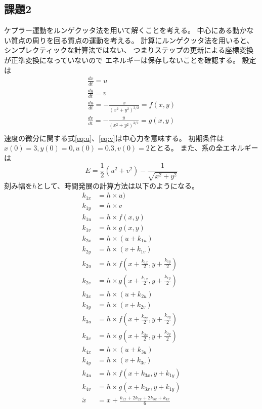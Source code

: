 \documentclass{jsarticle}
\begin{document}
\subsection{課題2}
ケプラー運動をルンゲクッタ法を用いて解くことを考える。
中心にある動かない質点の周りを回る質点の運動を考える。
計算にルンゲクッタ法を用いると、シンプレクティックな計算法ではない、
つまりステップの更新による座標変換が正準変換になっていないので
エネルギーは保存しないことを確認する。
設定は
\begin{align}
    \frac{dx}{dt} = u\\
    \frac{dy}{dt} = v\\
    \frac{du}{dt} = - \frac{x}{(x^2 + y^2)^{3/2}} = f(x, y)\label{eq:u}\\
    \frac{dv}{dt} = - \frac{y}{(x^2 + y^2)^{3/2}}=g(x,y)\label{eq:v}\\
\end{align}
速度の微分に関する式\eqref{eq:u}、\eqref{eq:v}は中心力を意味する。
初期条件は$x(0) = 3,y(0)=0,u(0)=0.3,v(0)=2$ととる。
また、系の全エネルギーは
\begin{equation}
    E = \frac{1}{2} (u^2 + v^2) - \frac{1}{\sqrt{x^2 + y^2}}
\end{equation}
刻み幅を$h$として、時間発展の計算方法は以下のようになる。
\begin{align}
    k_{1x} &= h  \times u)\\
    k_{1y} &= h  \times v\\
    k_{1u} &= h  \times f(x, y)\\
    k_{1v} &= h  \times g(x, y)\\
    k_{2x} &= h  \times (u + k_{1u})\\
    k_{2y} &= h  \times (v + k_{1v})\\
    k_{2u} &= h  \times f(x + \frac{k_{1x}}{2}, y+ \frac{k_{1y}}{2})\\
    k_{2v} &= h  \times g(x + \frac{k_{1x}}{2}, y+ \frac{k_{1y}}{2})\\
    k_{3x} &= h  \times (u + k_{2u})\\
    k_{3y} &= h  \times (v + k_{2v})\\
    k_{3u} &= h  \times f(x + \frac{k_{2x}}{2}, y+ \frac{k_{2y}}{2})\\
    k_{3v} &= h  \times g(x + \frac{k_{2x}}{2}, y+ \frac{k_{2y}}{2})\\
    k_{4x} &= h  \times (u + k_{3u})\\
    k_{4y} &= h  \times (v + k_{3v})\\
    k_{4u} &= h  \times f(x + k_{3x}, y+ k_{1y})\\
    k_{4v} &= h  \times g(x + k_{3x}, y+ k_{1y})\\
    \tilde{x} &= x + \frac{k_{1x} + 2k_{2x} + 2k_{3x} + k_{4x}}{6}
\end{align}
\end{document}

